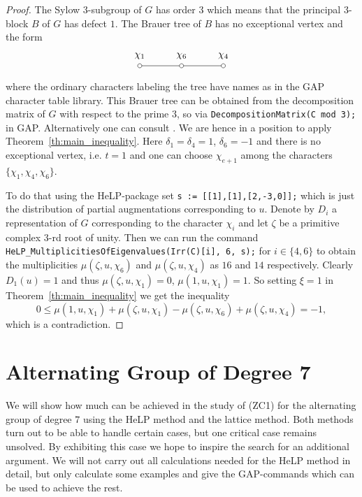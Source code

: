 \documentclass[10pt,a4paper,reqno]{amsart}
\theoremstyle{definition}
\theoremstyle{remark}
\begin{document}
{\begin{proof}
The Sylow $3$-subgroup of $G$ has order $3$ which means that the principal $3$-block $B$ of $G$ has defect $1$. The Brauer tree of $B$ has no exceptional vertex and the form
\[
\begin{tikzpicture}
\node[label=north:{$\chi_1$}] at (0,1.5) (1){};
\node[label=north:{$\chi_6$}] at (1.5,1.5) (2){};
\node[label=north:{$\chi_4$}] at (3,1.5) (3){};
\foreach \p in {1,2,3}{
\draw[fill=white] (\p) circle (.075cm);
}
\draw (.075,1.5)--(1.425,1.5);
\draw (1.575,1.5)--(2.925,1.5);
\end{tikzpicture}
\] 
where the ordinary characters labeling the tree have names as in the \textsf{GAP} character table library. This Brauer tree can be obtained from the decomposition matrix of $G$ with respect to the prime $3$, so via \texttt{DecompositionMatrix(C mod 3);} in \textsf{GAP}. Alternatively one can consult \cite{HL89}. We are hence in a position to apply Theorem~\ref{th:main_inequality}. Here $\delta_1 = \delta_4 = 1$, $\delta_6 = -1$ and there is no exceptional vertex, i.e. $t = 1$ and one can choose $\chi_{e+1}$ among the characters $\{\chi_1, \chi_4, \chi_6 \}$.

To do that using the \textsf{HeLP}-package set \texttt{s := [[1],[1],[2,-3,0]];} which is just the distribution of partial augmentations corresponding to $u$. Denote by $D_i$ a representation of $G$ corresponding to the character $\chi_i$ and let $\zeta$ be a primitive complex $3$-rd root of unity. Then we can run the command \texttt{HeLP\_MultiplicitiesOfEigenvalues(Irr(C)[i], 6, s);} for $i \in \{4,6\}$ to obtain the multiplicities $\mu(\zeta, u, \chi_6)$ and $\mu(\zeta, u, \chi_4)$ as $16$ and $14$ respectively. Clearly $D_1(u) = 1$ and thus $\mu(\zeta, u, \chi_1) = 0$, $\mu(1, u, \chi_1) = 1$. So setting $\xi = 1$ in Theorem~\ref{th:main_inequality} we get the inequality
$$0 \leqslant \mu(1, u, \chi_1) + \mu(\zeta, u, \chi_1) - \mu(\zeta, u, \chi_6) + \mu(\zeta, u, \chi_4) = -1,$$
which is a contradiction. 
\end{proof}




\section{Alternating Group of Degree 7}\label{sec:A7}

We will show how much can be achieved in the study of (ZC1) for the alternating group of degree $7$ using the HeLP method and the lattice method. Both methods turn out to be able to handle certain cases, but one critical case remains unsolved. By exhibiting this case we hope to inspire the search for an additional argument. We will not carry out all calculations needed for the HeLP method in detail, but only calculate some examples and give the \textsf{GAP}-commands which can be used to achieve the rest. 

}
\end{document}
